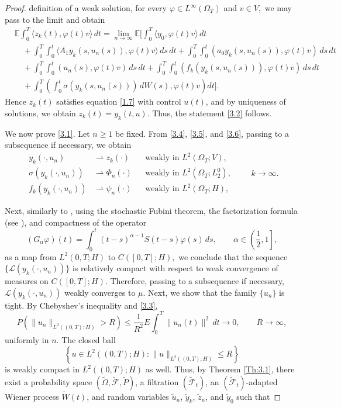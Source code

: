 \documentclass[a4paper,12pt]{article}
\numberwithin{equation}{section}
\def\E{\mathbb{E}}
\begin{document}
\begin{proof}
definition of a weak solution, for every
$\varphi\in L^\infty(\Omega_T)$ and 
$v\in V,
$
we may pass to the limit and obtain
\begin{align*}
& \E\int_0^T
\langle z_k(t),\varphi(t)v \rangle \,dt
=
\lim_{n\to\infty}
\E
\Biggl[
\int_0^T
\langle y_0,\varphi(t)v \rangle \,dt
\\
&\quad
+
\int_0^T
\int_0^t
\langle
A_1y_k(s,u_n(s)),
\varphi(t)v
\rangle
\,ds\,dt
+
\int_0^T
\int_0^t
(a_0y_k(s,u_n(s)),
\varphi(t)v)
\,ds\,dt
\\
&\quad
+
\int_0^T
\int_0^t
(u_n(s),\varphi(t)v)
\,ds\,dt
+
\int_0^T
\int_0^t
(f_k(y_k(s,u_n(s))),
\varphi(t)v)
\,ds\,dt
\\
&\quad
+
\int_0^T
\left(
\int_0^t
\sigma(y_k(s,u_n(s)))\,dW(s),
\varphi(t)v
\right)
dt
\Biggr].
\end{align*}
Hence $z_k(t)$ satisfies equation \eqref{1.7} with control
$u(t)$, and by uniqueness of solutions,
we obtain $z_k(t)=y_k(t,u)$. Thus, the statement \eqref{3.2} follows.

We now prove \eqref{3.1}. Let $n \ge 1$ be fixed. From \eqref{3.4}, \eqref{3.5}, and \eqref{3.6}, passing to a subsequence if necessary, we obtain
\begin{equation}
\begin{aligned}
y_k(\cdot,u_n)
&\rightharpoonup
z_k(\cdot)
&&\text{weakly in }
L^2(\Omega_T;V),\\
\sigma(y_k(\cdot,u_n))
&\rightharpoonup
\Phi_n(\cdot)
&&\text{weakly in }
L^2(\Omega_T;L_2^0),\\
f_k(y_k(\cdot,u_n))
&\rightharpoonup
\psi_n(\cdot)
&&\text{weakly in }
L^2(\Omega_T;H),
\end{aligned}
\qquad k\to\infty.
\label{3.8}
\end{equation}

Next, similarly to \cite{20}, using the stochastic Fubini theorem,
the factorization formula (see \cite{19}), and compactness of the
operator 
\[
(G_\alpha\varphi)(t)
=
\int_0^t
(t-s)^{\alpha-1}
S(t-s)\varphi(s)\,ds,
\qquad
\alpha\in\left(\frac12,1\right],
\]
as a map from
$L^2(0,T;H)$ to $
C([0,T];H),
$
we conclude that the sequence $\{\mathcal L(y_k(\cdot,u_n))\}$
is relatively compact with respect to weak convergence of measures on
\(C([0,T];H)\). Therefore, passing to a subsequence if necessary,
$\mathcal L(y_k(\cdot,u_n))
$
weakly converges to $\mu$. Next, we show that the family $\{u_n\}$ is tight. By Chebyshev's inequality and
\eqref{3.3},
\[
P\!\left(
\|u_n\|_{L^2((0,T);H)}
>R
\right)
\le
\frac1{R^2}
E\int_0^T
\|u_n(t)\|^2\,dt
\to 0,
\qquad
R\to\infty,
\]
uniformly in \(n\). The closed ball
\[
\left\{
u\in L^2((0,T);H):
\|u\|_{L^2((0,T);H)}\le R
\right\}
\]
is weakly compact in \(L^2((0,T);H)\) as well. Thus, by Theorem \ref{Th:3.1}, there exist a probability space
$(\widetilde\Omega,\widetilde{\mathcal F},\widetilde P)$,
a filtration $(\widetilde{\mathcal F}_t)$, an
$(\widetilde{\mathcal F}_t)$-adapted Wiener process
$\widetilde W(t)$, and random variables
$\widetilde u_n$, $\widetilde y_k$, $\widetilde z_n$, and
$\widetilde y_0$ such that


\end{proof}
\end{document}
